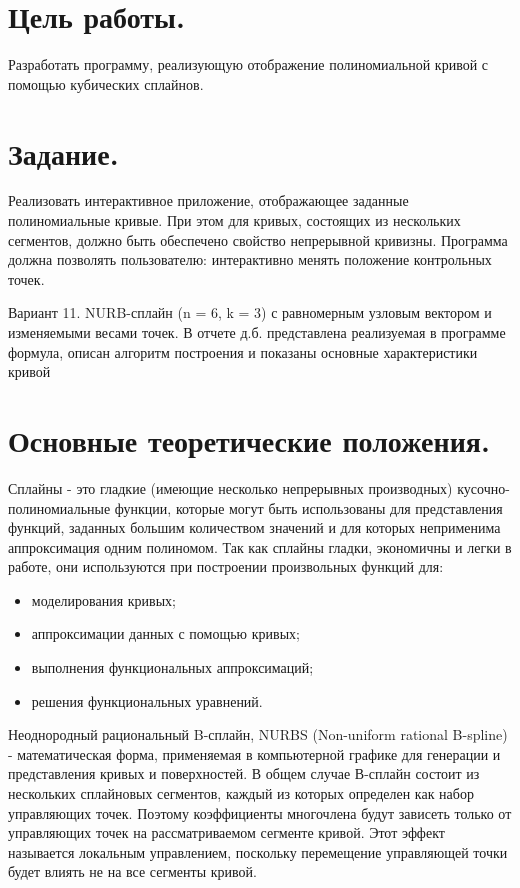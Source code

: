 \setcounter{page}{2}
\section*{Цель работы.}
Разработать программу, реализующую отображение полиномиальной кривой с помощью кубических сплайнов.

\section*{Задание.}
Реализовать интерактивное приложение, отображающее заданные полиномиальные кривые. При этом для кривых, состоящих из нескольких сегментов, должно быть обеспечено свойство непрерывной кривизны. Программа должна позволять пользователю: интерактивно менять положение контрольных точек.

Вариант 11. NURB-сплайн (n = 6, k = 3) с равномерным узловым вектором и изменяемыми весами точек.
В отчете д.б. представлена реализуемая в программе формула, описан алгоритм построения и показаны основные характеристики кривой


\section*{Основные теоретические положения.}
Сплайны - это гладкие (имеющие несколько непрерывных производных) кусочно-полиномиальные функции, которые могут быть использованы для представления функций, заданных большим количеством значений и для которых неприменима аппроксимация одним полиномом. Так как сплайны гладки, экономичны и легки в работе, они используются при построении произвольных функций для:
\begin{itemize}
    \item моделирования кривых;
    \item аппроксимации данных с помощью кривых;
    \item выполнения функциональных аппроксимаций;
    \item решения функциональных уравнений.
\end{itemize}

Неоднородный рациональный B-сплайн, NURBS (Non-uniform rational B-spline) - математическая форма, применяемая в компьютерной графике для генерации и представления кривых и поверхностей. В общем случае В-сплайн состоит из нескольких сплайновых сегментов, каждый из которых определен как набор управляющих точек. Поэтому коэффициенты многочлена будут зависеть только от управляющих точек на рассматриваемом сегменте кривой. Этот эффект называется локальным управлением, поскольку перемещение управляющей точки будет влиять не на все сегменты кривой.

